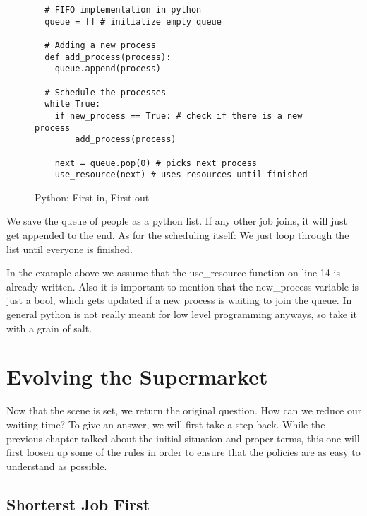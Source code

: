\begin{figure}[h]
\begin{verbatim}
  # FIFO implementation in python
  queue = [] # initialize empty queue

  # Adding a new process
  def add_process(process):
    queue.append(process)

  # Schedule the processes
  while True:
    if new_process == True: # check if there is a new process
        add_process(process)
    
    next = queue.pop(0) # picks next process
    use_resource(next) # uses resources until finished
\end{verbatim}
\caption{Python: First in, First out}
\label{code:fifo}
\end{figure}

We save the queue of people as a python list.
If any other job joins, it will just get appended to the end.
As for the scheduling itself:
We just loop through the list until everyone is finished.


In the example above we assume that the use\_resource function on line 14 is already written.
Also it is important to mention that the new\_process variable is just a bool, which gets updated if a new process is waiting to join the queue.
In general python is not really meant for low level programming anyways, so take it with a grain of salt.


\section{Evolving the Supermarket}

Now that the scene is set, we return the original question. 
How can we reduce our waiting time?
To give an answer, we will first take a step back.
While the previous chapter talked about the initial situation and proper terms, this one will first loosen up some of the rules in order to ensure that the policies are as easy to understand as possible.

\subsection{Shorterst Job First}

